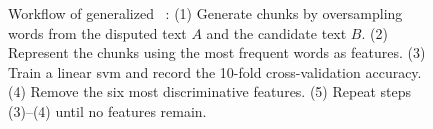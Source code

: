         

\begin{figure}[htbp]
    \centering
    
    \caption[Generalized \unmasking{} workflow.]{Workflow of generalized \unmasking{}~\citep{bevendorff_generalizing_2019}: 
    (1) Generate chunks by oversampling words from the disputed text $A$ and the candidate text $B$. 
    (2) Represent the chunks using the most frequent words as features. 
    (3) Train a linear \ac{svm} and record the 10-fold cross-validation accuracy. 
    (4) Remove the six most discriminative features. 
    (5) Repeat steps (3)–(4) until no features remain.}
    \label{fig:generalized_unmasking}
\end{figure}
